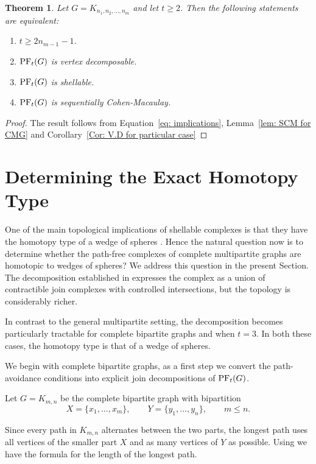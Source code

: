 \documentclass[12pt,reqno]{amsart}
\newtheorem{theorem}[theorem]{Theorem}
\theoremstyle{definition}
\newcommand{\PF}{{\rm PF}}
\begin{document}
\begin{theorem}\label{them: char for CMG}
    Let $G=K_{n_1, n_2, \dots, n_m}$ and let $t \ge 2$. Then the following statements are equivalent:
    \begin{enumerate}
        \item $t \ge 2n_{m-1}-1$.
        \item $\PF_t(G)$ is vertex decomposable.
        \item $\PF_t(G)$ is shellable.
        \item $\PF_t(G)$ is sequentially Cohen-Macaulay.
    \end{enumerate}
\end{theorem}
\begin{proof}
The result follows from Equation~\ref{eq: implications}, Lemma~\ref{lem: SCM for CMG} and Corollary~\ref{Cor: V.D for particular case}
\end{proof}

\section{Determining the Exact Homotopy Type}\label{sec:CBG-structure-topology}

One of the main topological implications of shellable complexes is that they have the homotopy type of a wedge of spheres \cite[Theorem 12.3]{kozlov2007}. 
Hence the natural question now is to determine whether the path-free complexes of complete multipartite graphs are homotopic to wedges of spheres?
We address this question in the present Section. 
The decomposition established in  expresses the complex as a union of contractible join complexes with controlled intersections, but the topology is considerably richer. 

In contrast to the general multipartite setting, the decomposition becomes particularly tractable for complete bipartite graphs and when $t=3$. 
In both these cases, the homotopy type is that of a wedge of spheres. 

We begin with complete bipartite graphs, as a first step we convert the path-avoidance conditions into explicit join decompositions of $\PF_t(G)$. 


Let $G=K_{m,n}$ be the complete bipartite graph with bipartition
\[
X=\{x_1,\dots,x_m\}, \qquad Y=\{y_1,\dots,y_n\}, \qquad m\le n.
\]

Since every path in $K_{m,n}$ alternates between the two parts, the longest path uses all vertices of the smaller part $X$ and as many vertices of $Y$ as possible. 
Using  we have the formula for the length of the longest path. 
\end{document}
